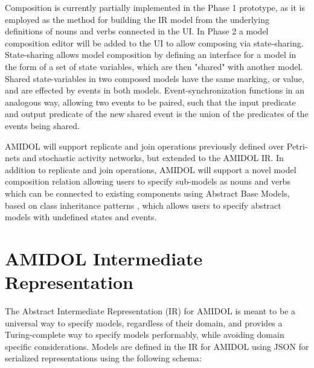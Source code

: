 \documentclass[11pt]{article}
\newcommand{\amidol}{\textsc{AMIDOL}}
\begin{document}
Composition is currently partially implemented in the Phase 1 prototype, as it is employed as the method for building the IR model from the underlying definitions of nouns and verbs connected in the UI.  In Phase 2 a model composition editor will be added to the UI to allow composing via state-sharing. State-sharing allows model composition by defining an interface for a model in the form of a set of state variables, which are then "shared" with another model.  Shared state-variables in two composed models have the same marking, or value, and are effected by events in both models.  Event-synchronization functions in an analogous way, allowing two events to be paired, such that the input predicate and output predicate of the new shared event is the union of the predicates of the events being shared.

\amidol{} will support replicate and join operations previously defined over Petri-nets and stochastic activity networks, but extended to the \amidol{} IR. \cite{sanders1995ultrasan}  In addition to replicate and join operations, \amidol{} will support a novel model composition relation allowing users to specify sub-models as nouns and verbs which can be connected to existing components using Abstract Base Models, based on class inheritance patterns \cite{bruce2002foundations}, which allows users to specify abstract models with undefined states and events.

\section{\amidol{} Intermediate Representation}

The Abstract Intermediate Representation (IR) for \amidol{} is meant to be a universal way to specify models, regardless of their domain, and provides a Turing-complete way to specify models performably, while avoiding domain specific considerations.  Models are defined in the IR for \amidol{} using JSON for serialized representations using the following schema:
\end{document}
